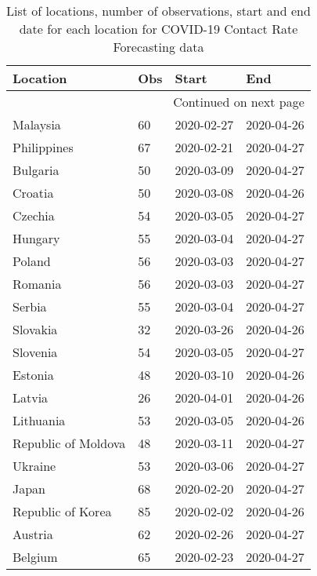 \begin{longtable}{llll}
\caption{List of locations, number of observations, start and end date for each location for COVID-19 Contact Rate Forecasting data}\\
\toprule
                   Location & Obs &      Start &        End \\
\midrule
\endhead
\midrule
\multicolumn{4}{r}{{Continued on next page}} \\
\midrule
\endfoot

\bottomrule
\endlastfoot
                   Malaysia &  60 & 2020-02-27 & 2020-04-26 \\
                Philippines &  67 & 2020-02-21 & 2020-04-27 \\
                   Bulgaria &  50 & 2020-03-09 & 2020-04-27 \\
                    Croatia &  50 & 2020-03-08 & 2020-04-26 \\
                    Czechia &  54 & 2020-03-05 & 2020-04-27 \\
                    Hungary &  55 & 2020-03-04 & 2020-04-27 \\
                     Poland &  56 & 2020-03-03 & 2020-04-27 \\
                    Romania &  56 & 2020-03-03 & 2020-04-27 \\
                     Serbia &  55 & 2020-03-04 & 2020-04-27 \\
                   Slovakia &  32 & 2020-03-26 & 2020-04-26 \\
                   Slovenia &  54 & 2020-03-05 & 2020-04-27 \\
                    Estonia &  48 & 2020-03-10 & 2020-04-26 \\
                     Latvia &  26 & 2020-04-01 & 2020-04-26 \\
                  Lithuania &  53 & 2020-03-05 & 2020-04-26 \\
        Republic of Moldova &  48 & 2020-03-11 & 2020-04-27 \\
                    Ukraine &  53 & 2020-03-06 & 2020-04-27 \\
                      Japan &  68 & 2020-02-20 & 2020-04-27 \\
          Republic of Korea &  85 & 2020-02-02 & 2020-04-26 \\
                    Austria &  62 & 2020-02-26 & 2020-04-27 \\
                    Belgium &  65 & 2020-02-23 & 2020-04-27 \\

\end{longtable}
